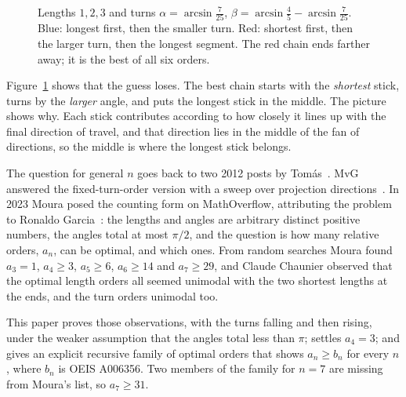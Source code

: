 \documentclass[11pt]{article}
\theoremstyle{remark}
\begin{document}
\begin{figure}[ht]
\centering
{}
\caption{Lengths $1,2,3$ and turns $\alpha=\arcsin\frac{7}{25}$, $\beta=\arcsin\frac45-\arcsin\frac7{25}$. Blue: longest first, then the smaller turn. Red: shortest first, then the larger turn, then the longest segment. The red chain ends farther away; it is the best of all six orders.}
\label{fig:three}
\end{figure}

Figure~\ref{fig:three} shows that the guess loses. The best chain starts with the \emph{shortest} stick, turns by the \emph{larger} angle, and puts the longest stick in the middle. The picture shows why. Each stick contributes according to how closely it lines up with the final direction of travel, and that direction lies in the middle of the fan of directions, so the middle is where the longest stick belongs.

The question for general $n$ goes back to two 2012 posts by Tom\'as~\cite{tomas-mse,tomas-mo}. MvG answered the fixed-turn-order version with a sweep over projection directions~\cite{mvg}. In 2023 Moura posed the counting form on MathOverflow, attributing the problem to Ronaldo Garcia~\cite{moura}: the lengths and angles are arbitrary distinct positive numbers, the angles total at most $\pi/2$, and the question is how many relative orders, $a_n$, can be optimal, and which ones. From random searches Moura found $a_3=1$, $a_4\ge3$, $a_5\ge6$, $a_6\ge14$ and $a_7\ge29$, and Claude Chaunier observed that the optimal length orders all seemed unimodal with the two shortest lengths at the ends, and the turn orders unimodal too.

This paper proves those observations, with the turns falling and then rising, under the weaker assumption that the angles total less than $\pi$; settles $a_4=3$; and gives an explicit recursive family of optimal orders that shows $a_n\ge b_n$ for every $n$, where $b_n$ is OEIS A006356. Two members of the family for $n=7$ are missing from Moura's list, so $a_7\ge31$.
\end{document}
